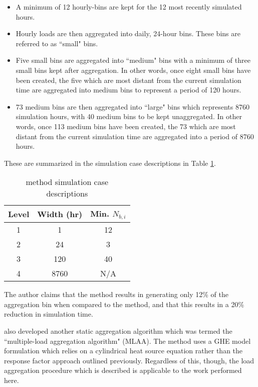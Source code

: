 \documentclass[review,12pt]{elsarticle}
\begin{document}
\begin{itemize}
    \item A minimum of 12 hourly-bins are kept for the 12 most recently simulated hours.

    \item Hourly loads are then aggregated into daily, 24-hour bins. These bins are referred to as ``small" bins.

    \item Five small bins are aggregated into ``medium" bins with a minimum of three small bins kept after aggregation. In other words, once eight small bins have been created, the five which are most distant from the current simulation time are aggregated into medium bins to represent a period of 120 hours.

    \item 73 medium bins are then aggregated into ``large" bins which represents 8760 simulation hours, with 40 medium bins to be kept unaggregated. In other words, once 113 medium bins have been created, the 73 which are most distant from the current simulation time are aggregated into a period of 8760 hours.

\end{itemize}

These are summarized in the simulation case descriptions in Table \ref{tab: hierarchical cases}.

\begin{table}[htbp!]
\centering
\caption{\cite{Liu2005} method simulation case descriptions}
\label{tab: hierarchical cases}
\begin{tabular}{|c|c|c|}
\hline
Level & Width (hr) & Min. $N_{b,i}$ \\ \hline \hline
1     & 1          & 12        \\ \hline
2     & 24         & 3         \\ \hline
3     & 120        & 40        \\ \hline
4     & 8760       & N/A       \\ \hline
\end{tabular}
\end{table}

The author claims that the method results in generating only 12\% of the aggregation bin when compared to the \cite{YavuzturkSpitler1999} method, and that this results in a 20\% reduction in simulation time.

\cite{BernierPinelLabibPaillot2004} also developed another static aggregation algorithm which was termed the ``multiple-load aggregation algorithm" (MLAA). The method uses a GHE model formulation which relies on a cylindrical heat source equation rather than the response factor approach outlined previously. Regardless of this, though, the load aggregation procedure which is described is applicable to the work performed here.
\end{document}

